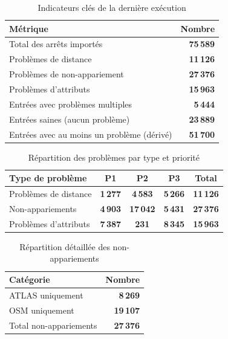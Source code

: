 \begin{table}[H]
\centering
\caption{Indicateurs clés de la dernière exécution}
\label{tab:chap6_execution_counters}
\small
\begin{tabular}{l r}
\toprule
Métrique & Nombre \\
\midrule
Total des arrêts importés & \textbf{75\,589} \\
Problèmes de distance & \textbf{11\,126} \\
Problèmes de non-appariement & \textbf{27\,376} \\
Problèmes d'attributs & \textbf{15\,963} \\
Entrées avec problèmes multiples & \textbf{5\,444} \\
Entrées saines (aucun problème) & \textbf{23\,889} \\
\midrule
Entrées avec au moins un problème (dérivé) & \textbf{51\,700} \\
\bottomrule
\end{tabular}
\end{table}

\begin{table}[H]
\centering
\caption{Répartition des problèmes par type et priorité}
\label{tab:chap6_problems_by_priority}
\small
\begin{tabular}{l c c c c}
\toprule
Type de problème & P1 & P2 & P3 & Total \\
\midrule
Problèmes de distance & \textbf{1\,277} & \textbf{4\,583} & \textbf{5\,266} & \textbf{11\,126} \\
Non-appariements & \textbf{4\,903} & \textbf{17\,042} & \textbf{5\,431} & \textbf{27\,376} \\
Problèmes d'attributs & \textbf{7\,387} & \textbf{231} & \textbf{8\,345} & \textbf{15\,963} \\
\bottomrule
\end{tabular}
\end{table}

\begin{table}[H]
\centering
\caption{Répartition détaillée des non-appariements}
\label{tab:chap6_unmatched_breakdown}
\small
\begin{tabular}{l r}
\toprule
Catégorie & Nombre \\
\midrule
ATLAS uniquement & \textbf{8\,269} \\
OSM uniquement & \textbf{19\,107} \\
\midrule
Total non-appariements & \textbf{27\,376} \\
\bottomrule
\end{tabular}
\end{table}




